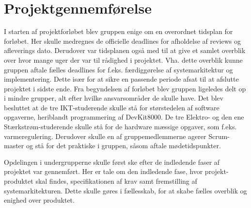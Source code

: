 \section{Projektgennemførelse}

I starten af projektforløbet blev gruppen enige om en overordnet tidsplan for forløbet. Her skulle medregnes de officielle deadlines for afholdelse af reviews og afleverings dato. Derudover var tidsplanen også med til at give et samlet overblik over hvor mange uger der var til rådighed i projektet. Vha. dette overblik kunne gruppen aftale fælles deadlines for f.eks. færdiggørelse af systemarkitektur og implementering. Dette især for at sikre en passende periode afsat til at afslutte projektet i sidste ende. 
\newline Fra begyndelsen af forløbet blev gruppen ligeledes delt op i mindre grupper, alt efter hvilke ansvarsområder de skulle have. \newline
Det blev besluttet at de tre IKT-studerende skulle stå for størstedelen af software opgaverne, heriblandt programmering af DevKit8000. De tre Elektro- og den ene Stærkstrøm-studerende skulle stå for de hardware mæssige opgaver, som f.eks. varmeregulering.
Derudover skulle en af gruppemedlemmerne agerer Scrum-master og stå for det praktiske i gruppen, såsom aftale mødetidspunkter.

Opdelingen i undergrupperne skulle først ske efter de indledende faser af projektet var gennemført. Her er tale om den indledende fase, hvor projekt-produktet skal findes, specifikationen af krav samt fremstilling af systemarkitekturen. 
Dette skulle gøres i fællesskab, for at skabe fælles overblik og enighed over produktet.

